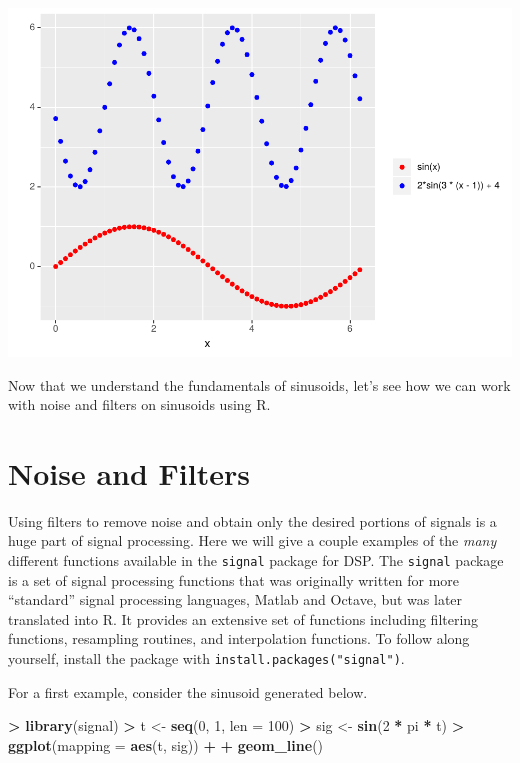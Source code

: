 \documentclass[
]{krantz}
\makeatletter
\newenvironment{Shaded}{\begin{snugshade}}{\end{snugshade}}
\newcommand{\DataTypeTok}[1]{\textcolor[rgb]{0.27,0.27,0.27}{#1}}
\newcommand{\DecValTok}[1]{\textcolor[rgb]{0.06,0.06,0.06}{#1}}
\newcommand{\KeywordTok}[1]{\textcolor[rgb]{0.27,0.27,0.27}{\textbf{#1}}}
\newcommand{\NormalTok}[1]{#1}
\newcommand{\OperatorTok}[1]{\textcolor[rgb]{0.43,0.43,0.43}{\textbf{#1}}}
\newcommand{\StringTok}[1]{\textcolor[rgb]{0.5,0.5,0.5}{#1}}
\newenvironment{kframe}{%
\medskip{}
\setlength{\fboxsep}{.8em}
 \def\at@end@of@kframe{}%
 \ifinner\ifhmode%
  \def\at@end@of@kframe{\end{minipage}}%
  \begin{minipage}{\columnwidth}%
 \fi\fi%
 \def\FrameCommand##1{\hskip\@totalleftmargin \hskip-\fboxsep
 \colorbox{shadecolor}{##1}\hskip-\fboxsep
     \hskip-\linewidth \hskip-\@totalleftmargin \hskip\columnwidth}%
 \MakeFramed {\advance\hsize-\width
   \@totalleftmargin\z@ \linewidth\hsize
   \@setminipage}}%
 {\par\unskip\endMakeFramed%
 \at@end@of@kframe}
\renewenvironment{Shaded}{\begin{kframe}}{\end{kframe}}
\makeatother
\begin{document}
\includegraphics{bookdown_files/figure-latex/unnamed-chunk-324-1.pdf}

Now that we understand the fundamentals of sinusoids, let's see how we can work with noise and filters on sinusoids using R.

\hypertarget{noise-and-filters}{%
\section{Noise and Filters}\label{noise-and-filters}}

Using filters to remove noise and obtain only the desired portions of signals is a huge part of signal processing. Here we will give a couple examples of the \emph{many} different functions available in the \texttt{signal} package for DSP. The \texttt{signal} package is a set of signal processing functions that was originally written for more ``standard'' signal processing languages, Matlab and Octave, but was later translated into R. It provides an extensive set of functions including filtering functions, resampling routines, and interpolation functions. To follow along yourself, install the package with \texttt{install.packages("signal")}.

For a first example, consider the sinusoid generated below.

\begin{Shaded}
\begin{Highlighting}[]
\OperatorTok{\textgreater{}}\StringTok{ }\KeywordTok{library}\NormalTok{(signal)}
\OperatorTok{\textgreater{}}\StringTok{ }\NormalTok{t \textless{}{-}}\StringTok{ }\KeywordTok{seq}\NormalTok{(}\DecValTok{0}\NormalTok{, }\DecValTok{1}\NormalTok{, }\DataTypeTok{len =} \DecValTok{100}\NormalTok{)}
\OperatorTok{\textgreater{}}\StringTok{ }\NormalTok{sig \textless{}{-}}\StringTok{ }\KeywordTok{sin}\NormalTok{(}\DecValTok{2} \OperatorTok{*}\StringTok{ }\NormalTok{pi }\OperatorTok{*}\StringTok{ }\NormalTok{t)}
\OperatorTok{\textgreater{}}\StringTok{ }\KeywordTok{ggplot}\NormalTok{(}\DataTypeTok{mapping =} \KeywordTok{aes}\NormalTok{(t, sig)) }\OperatorTok{+}\StringTok{ }
\OperatorTok{+}\StringTok{   }\KeywordTok{geom\_line}\NormalTok{()}
\end{Highlighting}
\end{Shaded}
\end{document}

